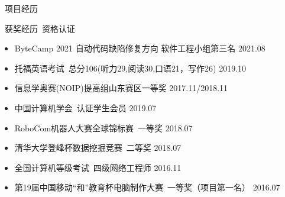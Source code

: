 \documentclass[UTF8]{resume}
\begin{document}
\begin{rSection}{\faUsers~项目经历}
\end{rSection}

\begin{rSection}{\faAward~获奖经历~资格认证}
    \begin{itemize}
        \itemsep -0.5em
        \item ByteCamp 2021 自动代码缺陷修复方向 软件工程小组第三名 \hfill 2021.08
        \item 托福英语考试~总分106(听力29,阅读30,口语21，写作26) \hfill 2019.10
        \item 信息学奥赛(NOIP)提高组山东赛区一等奖 \hfill 2017.11/2018.11
        \item 中国计算机学会~认证学生会员 \hfill 2019.07
        \item RoboCom机器人大赛全球锦标赛~一等奖 \hfill 2018.07
        \item 清华大学登峰杯数据挖掘竞赛~二等奖 \hfill 2018.07 
        \item 全国计算机等级考试~四级网络工程师 \hfill 2016.11
        \item 第19届中国移动“和”教育杯电脑制作大赛~一等奖（项目第一名） \hfill 2016.07
    \end{itemize}
\end{rSection}
\end{document}

